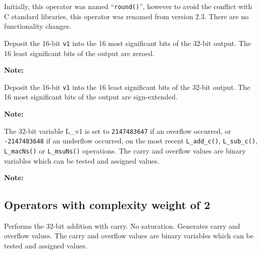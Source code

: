 
Initially, this operator was named ``{\tt round()}'', however to avoid
the conflict with C standard libraries, this operator was renamed from
version 2.3. There are no functionality changes.


Deposit the 16-bit {\tt v1} into the 16 most significant bits
of the 32-bit output. The 16 least significant bits of the output
are zeroed.

\textbf{Note:} \hfill {}


Deposit the 16-bit {\tt v1} into the 16 least significant bits
of the 32-bit output. The 16 most significant bits of the output
are sign-extended.

\textbf{Note:} \hfill {}



The 32-bit variable L\_v1 is set to {\tt 2147483647} if an overflow
occurred, or {\tt -2147483648} if an underflow occurred, on the
most recent {\tt L\_add\_c()}, {\tt L\_sub\_c()}, {\tt L\_macNs()}
or {\tt L\_msuNs()} operations. The carry and overflow values are
binary variables which can be tested and assigned values.

\textbf{Note:} \hfill {}


\subsection{Operators with complexity weight of 2}


Performs the 32-bit addition with carry. No saturation. Generates
carry and overflow values. The carry and overflow values are
binary variables which can be tested and assigned values.

\ \\

